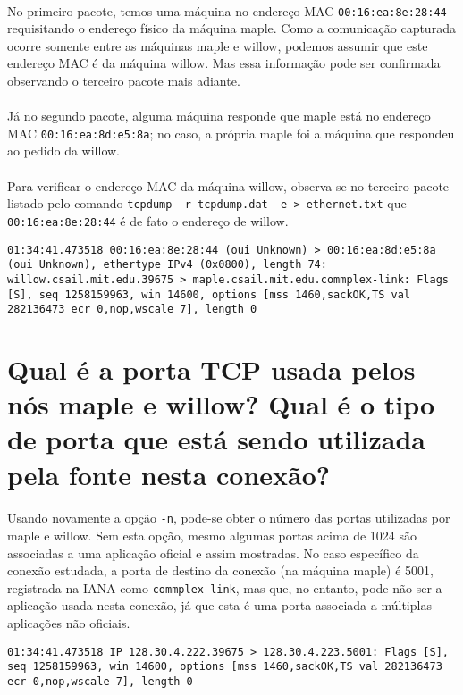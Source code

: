 \documentclass[a4paper,10pt,oneside,final,titlepage,onecolumn]{article}
\begin{document}
\paragraph{}No primeiro pacote, temos uma máquina no endereço MAC \verb|00:16:ea:8e:28:44| requisitando o endereço físico da máquina maple. Como a comunicação capturada ocorre somente entre as máquinas maple e willow, podemos assumir que este endereço MAC é da máquina willow. Mas essa informação pode ser confirmada observando o terceiro pacote mais adiante.
\paragraph{}Já no segundo pacote, alguma máquina responde que maple está no endereço MAC \verb|00:16:ea:8d:e5:8a|; no caso, a própria maple foi a máquina que respondeu ao pedido da willow.
\paragraph{}Para verificar o endereço MAC da máquina willow, observa-se no terceiro pacote listado pelo comando \verb|tcpdump -r tcpdump.dat -e > ethernet.txt| que \verb|00:16:ea:8e:28:44| é de fato o endereço de willow.
\begin{lstlisting}
01:34:41.473518 00:16:ea:8e:28:44 (oui Unknown) > 00:16:ea:8d:e5:8a (oui Unknown), ethertype IPv4 (0x0800), length 74: willow.csail.mit.edu.39675 > maple.csail.mit.edu.commplex-link: Flags [S], seq 1258159963, win 14600, options [mss 1460,sackOK,TS val 282136473 ecr 0,nop,wscale 7], length 0
\end{lstlisting}



\section{Qual é a porta TCP usada pelos nós maple e willow? Qual é o tipo de porta que está sendo utilizada pela fonte nesta conexão?}
\paragraph{}Usando novamente a opção \verb|-n|, pode-se obter o número das portas utilizadas por maple e willow. Sem esta opção, mesmo algumas portas acima de 1024 são associadas a uma aplicação oficial e assim mostradas. No caso específico da conexão estudada, a porta de destino da conexão (na máquina maple) é 5001, registrada na IANA como \verb|commplex-link|, mas que, no entanto, pode não ser a aplicação usada nesta conexão, já que esta é uma porta associada a múltiplas aplicações não oficiais.
\begin{lstlisting}
01:34:41.473518 IP 128.30.4.222.39675 > 128.30.4.223.5001: Flags [S], seq 1258159963, win 14600, options [mss 1460,sackOK,TS val 282136473 ecr 0,nop,wscale 7], length 0
\end{lstlisting}
\end{document}
